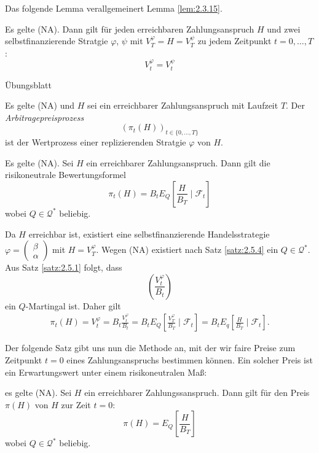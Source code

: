 \documentclass[a4paper,twoside,DIV15,BCOR12mm]{scrbook}
\newcommand{\cF}{\mathcal F}
\newcommand{\cQ}{\mathcal Q}
\begin{document}
Das folgende Lemma verallgemeinert Lemma \ref{lem:2.3.15}. 
\begin{lemma}
Es gelte (NA). Dann gilt für jeden erreichbaren Zahlungsanspruch $H$ und zwei selbstfinanzierende Stratgie $\varphi$, $\psi$ mit $V_T^\varphi = H = V_T^\psi$ zu jedem Zeitpunkt $t=0,\ldots,T$: \label{lem:2.5.6}
\[
V_t^\varphi = V_t^\psi
\]
\end{lemma}
\begin{beweis}
Übungsblatt
\end{beweis}

\begin{definition}
Es gelte (NA) und $H$ sei ein erreichbarer Zahlungsanspruch mit Laufzeit $T$. Der \emph{Arbitragepreisprozess}
\[
(\pi_t(H))_{t\in\{0,\ldots,T\}}
\]
ist der Wertprozess einer replizierenden Stratgie $\varphi$ von $H$.
\end{definition}

\begin{satz}
Es gelte (NA). Sei $H$ ein erreichbarer Zahlungsanspruch. Dann gilt die risikoneutrale Bewertungsformel\label{satz:2.5.8}
\[
\pi_t(H) = B_t E_Q[\frac H{B_T}\mid \cF_t]
\]
wobei $Q\in \cQ^*$ beliebig.
\end{satz}

\begin{beweis}
Da $H$ erreichbar ist, existiert eine selbstfinanzierende Handelsstrategie 
$\varphi=\left(\begin{smallmatrix} \beta \\ \alpha \end{smallmatrix}\right)$
mit $H = V_T^\varphi$. Wegen (NA) existiert nach Satz \ref{satz:2.5.4} ein $Q\in\cQ^*$. Aus Satz \ref{satz:2.5.1} folgt, dass 
\[
\left(\frac{V_t^\varphi}{B_t}\right)
\]
ein $Q$-Martingal ist. Daher gilt
\begin{align*}
\pi_t(H) = V_t^\varphi = B_t \frac{V_t^\varphi}{B_t} = B_t E_Q [ \frac{V_T^\varphi}{B_T} \mid \cF_t] = B_t E_q[ \frac H {B_T} \mid \cF_t].
\end{align*}
\end{beweis}

Der folgende Satz gibt uns nun die Methode an, mit der wir faire Preise zum Zeitpunkt $t=0$ eines Zahlungsanspruchs bestimmen können. Ein solcher Preis ist ein Erwartungswert unter einem risikoneutralen Maß:

\begin{korollar}
es gelte (NA). Sei $H$ ein erreichbarer Zahlungssanspruch. Dann gilt für den Preis $\pi(H)$ von $H$ zur Zeit $t=0$:
\[
\pi(H) = E_Q[\frac{H}{B_T}]
\]
wobei $Q\in \cQ^*$ beliebig.
\end{korollar}
\end{document}
